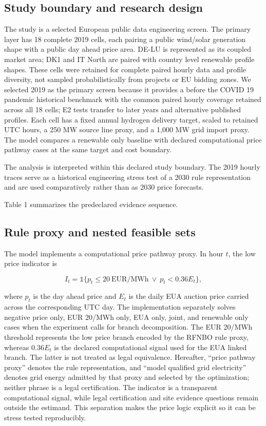 \documentclass[largeformat]{interact}
\begin{document}
\subsection{Study boundary and research
design}\label{study-boundary-and-research-design}

The study is a selected European public data engineering screen. The
primary layer has 18 complete 2019 cells, each pairing a public
wind/solar generation shape with a public day ahead price area. DE-LU is
represented as its coupled market area; DK1 and IT North are paired with
country level renewable profile shapes. These cells were retained for
complete paired hourly data and profile diversity, not sampled
probabilistically from projects or EU bidding zones. We selected 2019 as
the primary screen because it provides a before the COVID 19 pandemic
historical benchmark with the common paired hourly coverage retained
across all 18 cells; E2 tests transfer to later years and alternative
published profiles. Each cell has a fixed annual hydrogen delivery
target, scaled to retained UTC hours, a 250 MW source line proxy, and a
1,000 MW grid import proxy. The model compares a renewable only baseline
with declared computational price pathway cases at the same target and
cost boundary.

The analysis is interpreted within this declared study boundary. The
2019 hourly traces serve as a historical engineering stress test of a
2030 rule representation and are used comparatively rather than as 2030
price forecasts.

Table 1 summarizes the predeclared evidence sequence.




\subsection{Rule proxy and nested feasible
sets}\label{rule-proxy-and-nested-feasible-sets}

The model implements a computational price pathway proxy. In hour \(t\),
the low price indicator is

\[
I_t=\mathbb{1}\{p_t\leq20\ \text{EUR/MWh}\ \lor\ p_t<0.36E_t\},
\]

where \(p_t\) is the day ahead price and \(E_t\) is the daily EUA
auction price carried across the corresponding UTC day. The
implementation separately solves negative price only, EUR 20/MWh only,
EUA only, joint, and renewable only cases when the experiment calls for
branch decomposition. The EUR 20/MWh threshold represents the low price
branch encoded by the RFNBO rule proxy, whereas \(0.36E_t\) is the
declared computational signal used for the EUA linked branch. The latter
is not treated as legal equivalence. Hereafter, ``price pathway proxy''
denotes the rule representation, and ``model qualified grid
electricity'' denotes grid energy admitted by that proxy and selected by
the optimization; neither phrase is a legal certification. The indicator
is a transparent computational signal, while legal certification and
site evidence questions remain outside the estimand. This separation
makes the price logic explicit so it can be stress tested reproducibly.
\end{document}
